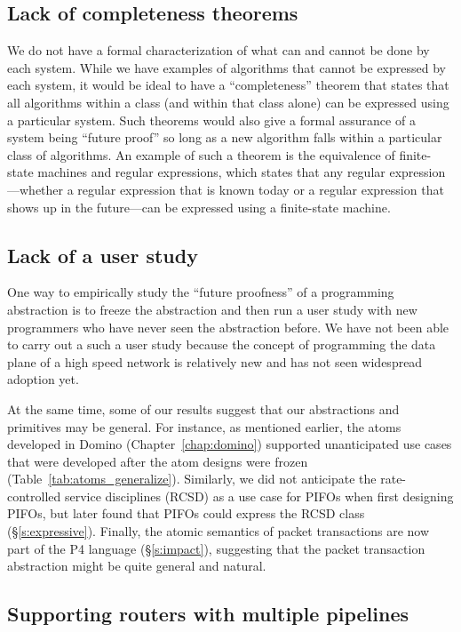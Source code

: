 \subsection{Lack of completeness theorems}
\label{ss:limit_completeness}

We do not have a formal characterization of what can and cannot be done by each
system. While we have examples of algorithms that cannot be expressed by each
system, it would be ideal to have a ``completeness'' theorem that states that
all algorithms within a class (and within that class alone) can be expressed
using a particular system. Such theorems would also give a formal assurance of
a system being ``future proof'' so long as a new algorithm falls within a
particular class of algorithms. An example of such a theorem is the equivalence
of finite-state machines and regular expressions, which states that any regular
expression---whether a regular expression that is known today or a regular
expression that shows up in the future---can be expressed using a finite-state
machine.

\subsection{Lack of a user study} One way to empirically study the ``future
proofness'' of a programming abstraction is to freeze the abstraction and then
run a user study with new programmers who have never seen the abstraction
before. We have not been able to carry out a such a user study because the
concept of programming the data plane of a high speed network is relatively new
and has not seen widespread adoption yet.

At the same time, some of our results suggest that our abstractions and
primitives may be general. For instance, as mentioned earlier, the atoms
developed in Domino (Chapter~\ref{chap:domino}) supported unanticipated use
cases that were developed after the atom designs were frozen
(Table~\ref{tab:atoms_generalize}). Similarly, we did not anticipate the
rate-controlled service disciplines (RCSD) as a use case for PIFOs when first
designing PIFOs, but later found that PIFOs could express the RCSD class
(\S\ref{s:expressive}).  Finally, the atomic semantics of  packet transactions
are now part of the P4 language (\S\ref{s:impact}), suggesting that the
packet transaction abstraction might be quite general and natural.

\subsection{Supporting routers with multiple pipelines}
\label{ss:multiple_pipelines}

